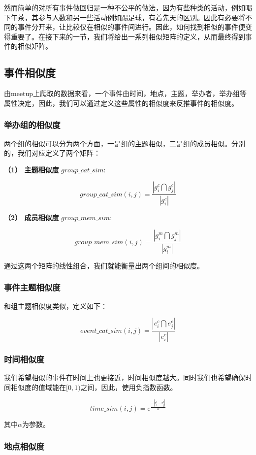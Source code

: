 然而简单的对所有事件做回归是一种不公平的做法，因为有些种类的活动，例如喝下午茶，其参与人数和另一些活动例如踢足球，有着先天的区别。因此有必要将不同的事件分开来，让比较仅在相似的事件间进行。因此，如何找到相似的事件便变得重要了。在接下来的一节，我们将给出一系列相似矩阵的定义，从而最终得到事件的相似矩阵。

\subsection{事件相似度}
由meetup上爬取的数据来看，一个事件由时间，地点，主题，举办者，举办组等属性决定，因此，我们可以通过定义这些属性的相似度来反推事件的相似度。

\subsubsection{举办组的相似度}
两个组的相似可以分为两个方面，一是组的主题相似，二是组的成员相似。分别的，我们对应定义了两个矩阵：

\textbf{（1） 主题相似度} \(group\_cat\_sim:\)

\[
group\_cat\_sim(i,j)=\frac{|g_i^c\bigcap g_j^c|}{|g_i^c|}
\]

\textbf{（2） 成员相似度} \(group\_mem\_sim:\)

\[
group\_mem\_sim(i,j)=\frac{|g_i^m\bigcap g_j^m|}{|g_i^m|}
\]

通过这两个矩阵的线性组合，我们就能衡量出两个组间的相似度。

\subsubsection{事件主题相似度}

和组主题相似度类似，定义如下：

\[
event\_cat\_sim(i,j)=\frac{|e_i^c\bigcap e_j^c|}{|e_i^c|}
\]

\subsubsection{时间相似度}

我们希望相似的事件在时间上也更接近，时间相似度越大。同时我们也希望确保时间相似度的值域能在\([0,1)\)之间，因此，使用负指数函数。

\[    
time\_sim(i,j)=\mathrm{e}^\frac{-|e_i^t-e_j^t|}{\alpha}
\]

其中\(\alpha\)为参数。

\subsubsection{地点相似度}

